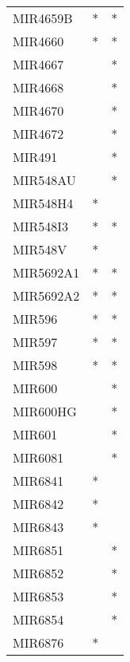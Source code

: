 \begin{longtable}{lcc}
MIR4659B              &              * &          * \\
MIR4660               &              * &          * \\
MIR4667               &                &          * \\
MIR4668               &                &          * \\
MIR4670               &                &          * \\
MIR4672               &                &          * \\
MIR491                &                &          * \\
MIR548AU              &                &          * \\
MIR548H4              &              * &            \\
MIR548I3              &              * &          * \\
MIR548V               &              * &            \\
MIR5692A1             &              * &          * \\
MIR5692A2             &              * &          * \\
MIR596                &              * &          * \\
MIR597                &              * &          * \\
MIR598                &              * &          * \\
MIR600                &                &          * \\
MIR600HG              &                &          * \\
MIR601                &                &          * \\
MIR6081               &                &          * \\
MIR6841               &              * &            \\
MIR6842               &              * &            \\
MIR6843               &              * &            \\
MIR6851               &                &          * \\
MIR6852               &                &          * \\
MIR6853               &                &          * \\
MIR6854               &                &          * \\
MIR6876               &              * &            \\

\end{longtable}
